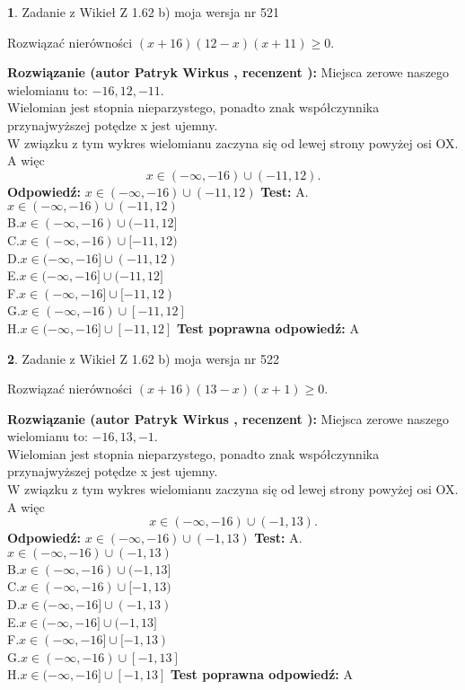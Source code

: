 \documentclass[12pt, a4paper]{article}
\theoremstyle{definition} %
\newtheorem{zad}{}
\newcommand{\zadStart}[1]{\begin{zad}#1\newline}
\newcommand{\zadStop}{\end{zad}}
\newcommand{\rozwStart}[2]{\noindent \textbf{Rozwiązanie (autor #1 , recenzent #2): }\newline}
\newcommand{\rozwStop}{\newline}
\newcommand{\odpStart}{\noindent \textbf{Odpowiedź:}\newline}
\newcommand{\odpStop}{\newline}
\newcommand{\testStart}{\noindent \textbf{Test:}\newline}
\newcommand{\testStop}{\newline}
\newcommand{\kluczStart}{\noindent \textbf{Test poprawna odpowiedź:}\newline}
\newcommand{\kluczStop}{\newline}
\begin{document}
\zadStart{Zadanie z Wikieł Z 1.62 b) moja wersja nr 521}

Rozwiązać nierówności $(x+16)(12-x)(x+11)\ge0$.
\zadStop
\rozwStart{Patryk Wirkus}{}
Miejsca zerowe naszego wielomianu to: $-16, 12, -11$.\\
Wielomian jest stopnia nieparzystego, ponadto znak współczynnika przy\linebreak najwyższej potędze x jest ujemny.\\ W związku z tym wykres wielomianu zaczyna się od lewej strony powyżej osi OX. A więc $$x \in (-\infty,-16) \cup (-11,12).$$
\rozwStop
\odpStart
$x \in (-\infty,-16) \cup (-11,12)$
\odpStop
\testStart
A.$x \in (-\infty,-16) \cup (-11,12)$\\
B.$x \in (-\infty,-16) \cup (-11,12]$\\
C.$x \in (-\infty,-16) \cup [-11,12)$\\
D.$x \in (-\infty,-16] \cup (-11,12)$\\
E.$x \in (-\infty,-16] \cup (-11,12]$\\
F.$x \in (-\infty,-16] \cup [-11,12)$\\
G.$x \in (-\infty,-16) \cup [-11,12]$\\
H.$x \in (-\infty,-16] \cup [-11,12]$
\testStop
\kluczStart
A
\kluczStop



\zadStart{Zadanie z Wikieł Z 1.62 b) moja wersja nr 522}

Rozwiązać nierówności $(x+16)(13-x)(x+1)\ge0$.
\zadStop
\rozwStart{Patryk Wirkus}{}
Miejsca zerowe naszego wielomianu to: $-16, 13, -1$.\\
Wielomian jest stopnia nieparzystego, ponadto znak współczynnika przy\linebreak najwyższej potędze x jest ujemny.\\ W związku z tym wykres wielomianu zaczyna się od lewej strony powyżej osi OX. A więc $$x \in (-\infty,-16) \cup (-1,13).$$
\rozwStop
\odpStart
$x \in (-\infty,-16) \cup (-1,13)$
\odpStop
\testStart
A.$x \in (-\infty,-16) \cup (-1,13)$\\
B.$x \in (-\infty,-16) \cup (-1,13]$\\
C.$x \in (-\infty,-16) \cup [-1,13)$\\
D.$x \in (-\infty,-16] \cup (-1,13)$\\
E.$x \in (-\infty,-16] \cup (-1,13]$\\
F.$x \in (-\infty,-16] \cup [-1,13)$\\
G.$x \in (-\infty,-16) \cup [-1,13]$\\
H.$x \in (-\infty,-16] \cup [-1,13]$
\testStop
\kluczStart
A
\kluczStop
\end{document}
